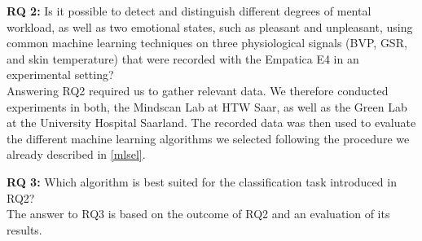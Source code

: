 \textbf{RQ 2:} Is it possible to detect and distinguish different degrees of mental workload, as well as two emotional states, such as pleasant and unpleasant, using common machine learning techniques on three physiological signals (BVP, GSR, and skin temperature) that were recorded with the Empatica E4 in an experimental setting?\\[10pt]

Answering RQ2 required us to gather relevant data. We therefore conducted experiments in both, the Mindscan Lab at HTW Saar, as well as the Green Lab at the University Hospital Saarland. The recorded data was then used to evaluate the different machine learning algorithms we selected following the procedure we already described in \ref{mlsel}. 

\textbf{RQ 3:} Which algorithm is best suited for the classification task introduced in RQ2?\\[10pt]
The answer to RQ3 is based on the outcome of RQ2 and an evaluation of its results.
